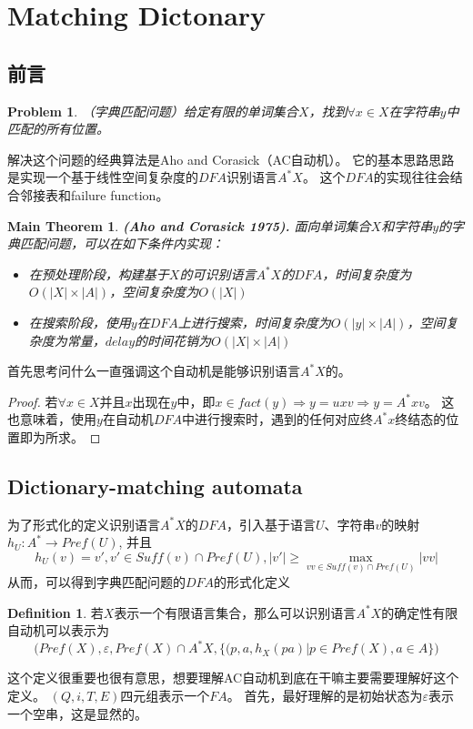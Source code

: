 \documentclass[UTF8]{ctexart}
\newtheorem{prob}[thm]{Problem}
\newtheorem{mthm}[thm]{Main Theorem}
\theoremstyle{definition}
\newtheorem{defn}[thm]{Definition}
\theoremstyle{remark}
\numberwithin{equation}{subsection}
\newcommand{\Emph}{\textbf}
\newcommand{\Suff}{\textit{Suff}}
\begin{document}

\section{Matching Dictonary}

\subsection{前言}
	
	\begin{prob}
		（字典匹配问题）给定有限的单词集合$X$，找到$\forall x \in X$在字符串$y$中匹配的所有位置。
	\end{prob}
	
	解决这个问题的经典算法是Aho and Corasick（AC自动机）。
	它的基本思路思路是实现一个基于线性空间复杂度的$DFA$识别语言$A^*X$。
	这个$DFA$的实现往往会结合邻接表和failure function。
	
	\begin{mthm}
		\Emph{(Aho and Corasick 1975).} 面向单词集合$X$和字符串$y$的字典匹配问题，可以在如下条件内实现：
		\begin{itemize}
			\item 在预处理阶段，构建基于$X$的可识别语言$A^*X$的$DFA$，时间复杂度为$O(|X|\times|A|)$，空间复杂度为$O(|X|)$
			\item 在搜索阶段，使用$y$在$DFA$上进行搜索，时间复杂度为$O(|y|\times|A|)$，空间复杂度为常量，$delay$的时间花销为$O(|X|\times|A|)$
		\end{itemize}
	\end{mthm}
	
	首先思考问什么一直强调这个自动机是能够识别语言$A^*X$的。
	\begin{proof}
		若$\forall x \in X$并且$x$出现在$y$中，即$x \in fact(y) \Rightarrow y=uxv \Rightarrow y=A^*xv$。
		这也意味着，使用$y$在自动机$DFA$中进行搜索时，遇到的任何对应终$A^*x$终结态的位置即为所求。
	\end{proof}
	
\subsection{Dictionary-matching automata}
	
	为了形式化的定义识别语言$A^*X$的$DFA$，引入基于语言$U$、字符串$v$的映射$h_U: A^* \rightarrow Pref(U) $, 并且
	\[
		h_U(v) = v', v' \in \Suff(v) \cap Pref(U), |v'| \ge \max_{vv \in \Suff(v)\cap Pref(U)} {|vv|}
	\]
	从而，可以得到字典匹配问题的$DFA$的形式化定义
	\begin{defn}
		若$X$表示一个有限语言集合，那么可以识别语言$A^*X$的确定性有限自动机可以表示为
		\[
			\Big( Pref(X), \varepsilon, Pref(X) \cap A^*X, \{(p,a,h_X(pa) | p \in Pref(X), a \in A\} \Big)
		\]
	\end{defn}
	这个定义很重要也很有意思，想要理解AC自动机到底在干嘛主要需要理解好这个定义。
	$(Q, i, T, E)$四元组表示一个$FA$。
	首先，最好理解的是初始状态为$\varepsilon$表示一个空串，这是显然的。
	
\end{document}

